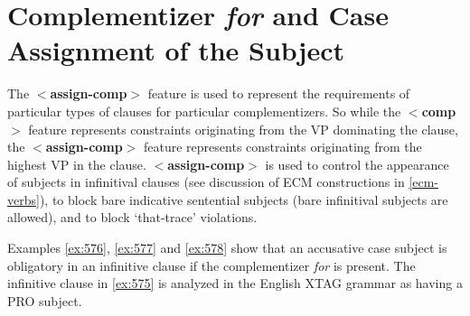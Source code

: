  
\section{Complementizer {\it for\/} and Case Assignment of the Subject} 
\label{for-complementizer} 
 
The {\bf $<$assign-comp$>$} feature is used to represent the 
requirements of particular types of clauses for particular 
complementizers.  So while the {\bf $<$comp$>$} feature represents 
constraints originating from the VP dominating the clause, the {\bf $<$assign-comp$>$} feature represents constraints originating from the 
highest VP in the clause. {\bf $<$assign-comp$>$} is used to control 
the appearance of subjects in infinitival clauses (see discussion of 
ECM constructions in \ref{ecm-verbs}), to block bare indicative 
sentential subjects (bare infinitival subjects are allowed), and to 
block `that-trace' violations. 
 
Examples \ref{ex:576}, \ref{ex:577} and \ref{ex:578} show that an accusative 
case subject is obligatory in an infinitive clause if the 
complementizer {\it for\/} is present. The infinitive clause in 
\ref{ex:575} is analyzed in the English XTAG grammar as 
having a PRO subject.  
 
 
\beginsentences
{}\label{ex:575} 
\label{ex:576} 
\label{ex:577} 
\label{ex:578} 
\endsentences

 
 
